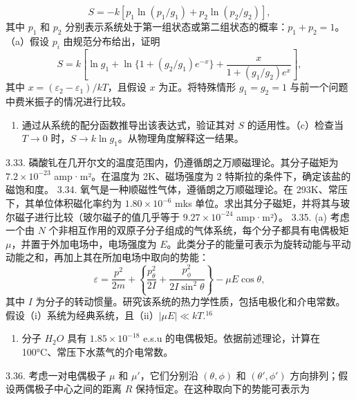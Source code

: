 \begin{equation}\tag{3.5.143}\label{eq:3.5.143}
S = - k [ p _ { 1 } \ln ( p _ { 1 } / g _ { 1 } ) + p _ { 2 } \ln ( p _ { 2 } / g _ { 2 } ) ] ,
\end{equation}
其中 \(p_{1}\) 和 \(p_{2}\) 分别表示系统处于第一组状态或第二组状态的概率：\(p_{1} + p_{2} = 1\)。
（a）假设 \(p_{i}\) 由规范分布给出，证明
\begin{equation}\tag{3.5.144}\label{eq:3.5.144}
S = k \left[ \ln g _ { 1 } + \ln \{ 1 + ( g _ { 2 } / g _ { 1 } ) e ^{- x} \} + \frac { x } { 1 + ( g _ { 1 } / g _ { 2 } ) e ^{x} } \right] ,
\end{equation}
其中 \(x=(\varepsilon_{2}-\varepsilon_{1})/kT\)，且假设 \(x\) 为正。将特殊情形 \(g_{1}=g_{2}=1\) 与前一个问题中费米振子的情况进行比较。
\begin{enumerate}
\def\labelenumi{(\alph{enumi})}
\setcounter{enumi}{1}
\item
  通过从系统的配分函数推导出该表达式，验证其对 \(S\) 的适用性。（c）检查当 \(T \rightarrow 0\) 时，\(S \rightarrow k \ln g_1\)。从物理角度解释这一结果。
\end{enumerate}
3.33. 磷酸钆在几开尔文的温度范围内，仍遵循朗之万顺磁理论。其分子磁矩为 \(7.2 \times 10^{-23}\) amp·m²。在温度为 2K、磁场强度为 2 特斯拉的条件下，确定该盐的磁饱和度。
3.34. 氧气是一种顺磁性气体，遵循朗之万顺磁理论。在 293K、常压下，其单位体积磁化率约为 \(1.80 \times 10^{-6}\) mks 单位。求出其分子磁矩，并将其与玻尔磁子进行比较（玻尔磁子的值几乎等于 \(9.27 \times 10^{-24}\) amp·m²）。
3.35. (a) 考虑一个由 \(N\) 个非相互作用的双原子分子组成的气体系统，每个分子都具有电偶极矩 \(\mu\)，并置于外加电场中，电场强度为 \(E\)。此类分子的能量可表示为旋转动能与平动动能之和，再加上其在所加电场中取向的势能：
\begin{equation}\tag{3.5.145}\label{eq:3.5.145}
\varepsilon = \frac { p ^{2} } { 2 m } + \left\{ \frac { p _ { \theta } ^{2} } { 2 I } + \frac { p _ { \phi } ^{2} } { 2 I \sin ^{2} \theta } \right\} - \mu E \cos \theta ,
\end{equation}
其中 \(I\) 为分子的转动惯量。研究该系统的热力学性质，包括电极化和介电常数。假设（i）系统为经典系统，且（ii）\(|\mu E| \ll kT\).\(^{16}\)
\begin{enumerate}
\def\labelenumi{(\alph{enumi})}
\setcounter{enumi}{1}
\item
  分子 \(H_{2}O\) 具有 \(1.85 \times 10^{-18}\) e.s.u 的电偶极矩。依据前述理论，计算在 100°C、常压下水蒸气的介电常数。
\end{enumerate}
3.36. 考虑一对电偶极子 \(\mu\) 和 \(\mu'\)，它们分别沿 \((\theta, \phi)\) 和 \((\theta', \phi')\) 方向排列；假设两偶极子中心之间的距离 \(R\) 保持恒定。在这种取向下的势能可表示为
